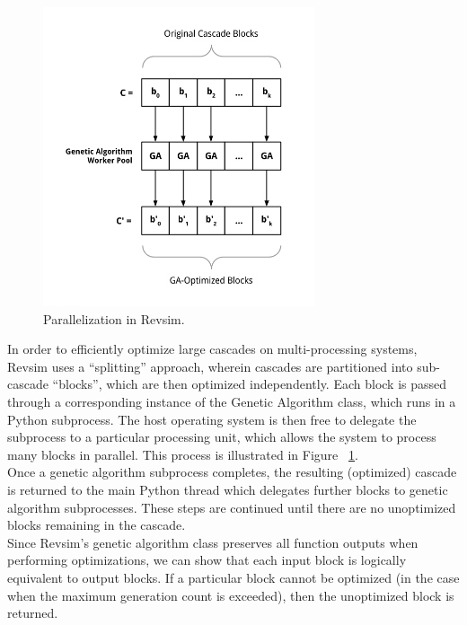 \begin{figure}
  \begin{center}
    \includegraphics[width=80mm]{diagrams/parallelization.png}
  \end{center}
  \caption{Parallelization in Revsim.}
  \label{fig:parallel}
\end{figure}

In order to efficiently optimize large cascades on multi-processing systems, Revsim uses a ``splitting'' approach, wherein cascades are partitioned into sub-cascade ``blocks'', which are then optimized independently. Each block is passed through a corresponding instance of the Genetic Algorithm class, which runs in a Python subprocess. The host operating system is then free to delegate the subprocess to a particular processing unit, which allows the system to process many blocks in parallel. This process is illustrated in Figure ~\ref{fig:parallel}. \\

Once a genetic algorithm subprocess completes, the resulting (optimized) cascade is returned to the main Python thread which delegates further blocks to genetic algorithm subprocesses. These steps are continued until there are no unoptimized blocks remaining in the cascade. \\

Since Revsim's genetic algorithm class preserves all function outputs when performing optimizations, we can show that each input block is logically equivalent to output blocks. If a particular block cannot be optimized (in the case when the maximum generation count is exceeded), then the unoptimized block is returned.



